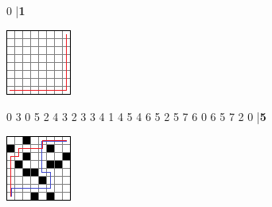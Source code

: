 \documentclass{../codeproblem}
\begin{document}
\begin{minipage}{.5\linewidth}
\begin{example}
0
|\textbf{1}\end{example}
\end{minipage}
\begin{minipage}{.5\linewidth}
\includegraphics[width=.5\linewidth]{pics/simplest}
\end{minipage}

\begin{minipage}{.5\linewidth}
\begin{example}
0 3
0 5
2 4
3 2
3 3
4 1
4 5
4 6
5 2
5 7
6 0
6 5
7 2
0
|\textbf{5}\end{example}
\end{minipage}
\begin{minipage}{.5\linewidth}
\includegraphics[width=.6\linewidth]{pics/example}
\end{minipage}
\end{document}
